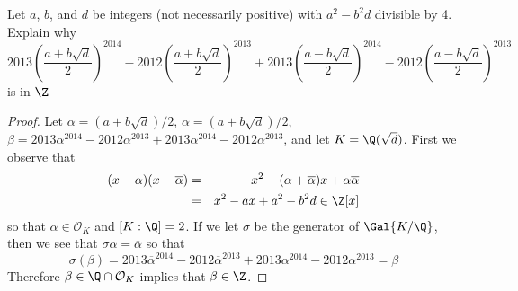 \documentclass[10pt]{amsart}
\begin{document}
\begin{thm}\label{Ex2}
	Let $a$, $b$, and $d$ be integers (not necessarily positive) with $a^2 - b^2d$ divisible by 4.
	Explain why
	$$2013\left(\frac{a + b\sqrt{d}}{2}\right)^{2014} -2012\left(\frac{a + b\sqrt{d}}{2}\right)^{2013} + 2013\left(\frac{a - b\sqrt{d}}{2}\right)^{2014} - 2012\left(\frac{a - b\sqrt{d}}{2}\right)^{2013}$$
	is in $\Z$

	\begin{proof}
		Let $\alpha = (a + b\sqrt{d})/2$, $\overline{\alpha} = (a + b\sqrt{d})/2$, $\beta = 2013\alpha^{2014} - 2012\alpha^{2013} + 2013\overline{\alpha}^{2014} - 2012\overline{\alpha}^{2013}$, and let $K = \Q(\sqrt{d})$. 
		First we observe that 
		\begin{eqnarray*}
			(x - \alpha)(x - \overline{\alpha}) &=& x^2 - (\alpha + \overline{\alpha})x + \alpha\overline{\alpha}\\
			&=& x^2 - ax + a^2 - b^2d \in \Z[x]
		\end{eqnarray*}
		so that $\alpha \in \mathcal{O}_K$ and $[K : \Q] = 2$.
		If we let $\sigma$ be the generator of $\Gal{K/\Q}$, then we see that $\sigma\alpha = \overline{\alpha}$ so that
		$$\sigma\left(\beta\right) = 2013\overline{\alpha}^{2014} - 2012\overline{\alpha}^{2013} + 2013\alpha^{2014} - 2012\alpha^{2013} = \beta$$
		Therefore $\beta \in \Q \cap \mathcal{O}_K$ implies that $\beta \in \Z$.
	\end{proof}
\end{thm}

\begin{thm}\label{Ex3}
\end{thm}

\begin{thm}\label{Ex4}
\end{thm}
\end{document}
